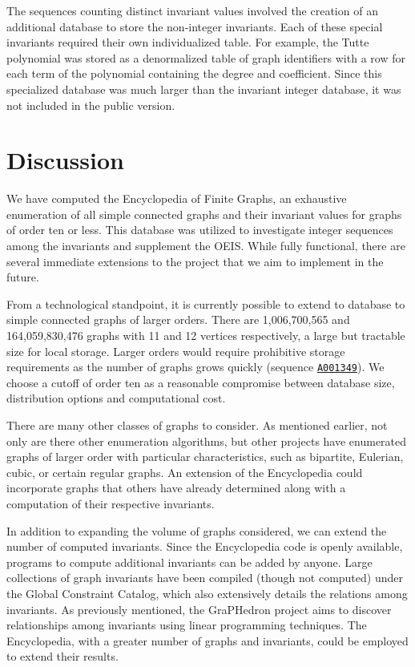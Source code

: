 \documentclass[12pt]{article}
\newcommand{\OEIS}[1]
{\href{https://oeis.org/#1}{\texttt{#1}}}
\begin{document}
The sequences counting distinct invariant values involved the creation of an additional database to store the non-integer invariants. 
Each of these special invariants required their own individualized table.
For example, the Tutte polynomial was stored as a denormalized table of graph identifiers with a row for each term of the polynomial containing the degree and coefficient.
Since this specialized database was much larger than the invariant integer database, it was not included in the public version.

\section{Discussion}

We have computed the Encyclopedia of Finite Graphs, an exhaustive enumeration of all simple connected graphs and their invariant values for graphs of order ten or less.
This database was utilized to investigate integer sequences among the invariants and supplement the OEIS.
While fully functional, there are several immediate extensions to the project that we aim to implement in the future.

From a technological standpoint, it is currently possible to extend to database to simple connected graphs of larger orders.
There are 1,006,700,565 and 164,059,830,476 graphs with 11 and 12 vertices respectively, a large but tractable size for local storage. 
Larger orders would require prohibitive storage requirements as the number of graphs grows quickly (sequence \OEIS{A001349}).
We choose a cutoff of order ten as a reasonable compromise between database size, distribution options and computational cost. 

There are many other classes of graphs to consider.
As mentioned earlier, not only are there other enumeration algorithms, but other projects have enumerated graphs of larger order with particular characteristics, such as bipartite, Eulerian, cubic, or certain regular graphs\cite{mckay2014combinatorial,royle2014small,meringer2014regular}.
An extension of the Encyclopedia could incorporate graphs that others have already determined along with a computation of their respective invariants.

In addition to expanding the volume of graphs considered, we can extend the number of computed invariants. 
Since the Encyclopedia code is openly available\cite{Travis2014Encyclopdia}, programs to compute additional invariants can be added by anyone. 
Large collections of graph invariants have been compiled (though not computed) under the Global Constraint Catalog, which also extensively details the relations among invariants\cite{beldiceanu2005global}.
As previously mentioned, the GraPHedron project aims to discover relationships among invariants using linear programming techniques. 
The Encyclopedia, with a greater number of graphs and invariants, could be employed to extend their results. 
\end{document}
